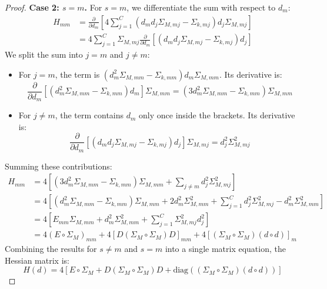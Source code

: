 \documentclass{article}
\theoremstyle{plain}
\theoremstyle{definition}
\theoremstyle{remark}
\begin{document}
\begin{proof}
\textbf{Case 2: $s = m$.}
For $s = m$, we differentiate the sum with respect to $d_m$:
\begin{align*}
  H_{mm} &= \frac{\partial}{\partial d_m} \left[ 4 \sum_{j=1}^C \left( d_m d_j \Sigma_{M,mj} - \Sigma_{k,mj} \right) d_j \Sigma_{M,mj} \right] \\
  &= 4 \sum_{j=1}^C \Sigma_{M,mj} \frac{\partial}{\partial d_m} \left[ \left( d_m d_j \Sigma_{M,mj} - \Sigma_{k,mj} \right) d_j \right]
\end{align*}
We split the sum into $j = m$ and $j \neq m$:
\begin{itemize}
  \item For $j = m$, the term is $(d_m^2 \Sigma_{M,mm} - \Sigma_{k,mm}) d_m \Sigma_{M,mm}$. Its derivative is:
  \begin{equation*}
    \frac{\partial}{\partial d_m} \left[ \left( d_m^2 \Sigma_{M,mm} - \Sigma_{k,mm} \right) d_m \right] \Sigma_{M,mm} = \left( 3 d_m^2 \Sigma_{M,mm} - \Sigma_{k,mm} \right) \Sigma_{M,mm}
  \end{equation*}
  \item For $j \neq m$, the term contains $d_m$ only once inside the brackets. Its derivative is:
  \begin{equation*}
    \frac{\partial}{\partial d_m} \left[ \left( d_m d_j \Sigma_{M,mj} - \Sigma_{k,mj} \right) d_j \right] \Sigma_{M,mj} = d_j^2 \Sigma_{M,mj}^2
  \end{equation*}
\end{itemize}
Summing these contributions:
\begin{align*}
  H_{mm} &= 4 \left[ \left( 3 d_m^2 \Sigma_{M,mm} - \Sigma_{k,mm} \right) \Sigma_{M,mm} + \sum_{j \neq m} d_j^2 \Sigma_{M,mj}^2 \right] \\
  &= 4 \left[ \left( d_m^2 \Sigma_{M,mm} - \Sigma_{k,mm} \right) \Sigma_{M,mm} + 2 d_m^2 \Sigma_{M,mm}^2 + \sum_{j=1}^C d_j^2 \Sigma_{M,mj}^2 - d_m^2 \Sigma_{M,mm}^2 \right] \\
  &= 4 \left[ E_{mm} \Sigma_{M,mm} + d_m^2 \Sigma_{M,mm}^2 + \sum_{j=1}^C \Sigma_{M,mj}^2 d_j^2 \right] \\
  &= 4 (E \circ \Sigma_M)_{mm} + 4 [D (\Sigma_M \circ \Sigma_M) D]_{mm} + 4 \left[ (\Sigma_M \circ \Sigma_M) (d \circ d) \right]_m
\end{align*}
Combining the results for $s \neq m$ and $s = m$ into a single matrix equation, the Hessian matrix is:
\begin{equation}
  H(d) = 4 \left[ E \circ \Sigma_M + D (\Sigma_M \circ \Sigma_M) D + \text{diag}\left( (\Sigma_M \circ \Sigma_M) (d \circ d) \right) \right]
\end{equation}


\end{proof}
\end{document}
